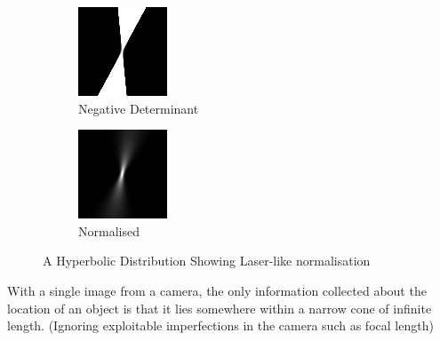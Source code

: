 \documentclass[a4paper, 11pt, titlepage]{article}
\begin{document}
      \begin{figure}
      \centering
      \begin{subfigure}{.5\textwidth}
        \centering
        \includegraphics[width=.7\linewidth]{images/GaussianRay1.png}
        \caption{Negative Determinant}
        \label{fig:hyperbolicsub1}
      \end{subfigure}%
      \begin{subfigure}{.5\textwidth}
        \centering
        \includegraphics[width=.7\linewidth]{images/GaussianRay2.png}
        \caption{Normalised}
        \label{fig:hyperbolicsub2}
      \end{subfigure}
      \caption{A Hyperbolic Distribution Showing Laser-like normalisation}
      \label{fig:hyperbolic}
      \end{figure}
      With a single image from a camera, the only information collected about the location of an object is that it lies somewhere within a narrow cone of infinite length.  (Ignoring exploitable imperfections in the camera such as focal length)
\end{document}
